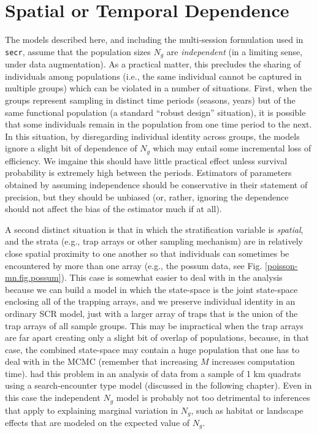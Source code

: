 \section{Spatial or Temporal Dependence}

The models described here, and including the multi-session formulation
used in \mbox{\tt secr}, assume that the population sizes $N_{g}$ are
{\it independent} (in a limiting sense, under data augmentation).  As
a practical matter, this precludes the sharing of individuals among
populations (i.e., the same individual cannot be captured in multiple
groups) which can be violated in a number of situations.  First, when
the groups represent sampling in distinct time periods (seasons,
years) but of the same functional population (a standard ``robust
design'' situation), it is possible that some individuals remain in
the population from one time period to the next.  In this situation,
by disregarding individual identity across groups, the models ignore a
slight bit of dependence of $N_{g}$ which may entail some incremental
loss of efficiency. We imgaine this should have little practical
effect unless survival probability is extremely high between the
periods.  Estimators of parameters obtained by assuming independence
should be conservative in their statement of precision, but they
should be unbiased (or, rather, ignoring the dependence should not
affect the bias of the estimator much if at all).

A second distinct situation is that in which the stratification
variable is {\it spatial}, and the strata (e.g., trap arrays or other
sampling mechanism) are in relatively close spatial proximity to one
another so that individuals can sometimes be encountered by more than
one array (e.g., the possum data, see
Fig. \ref{poisson-mn.fig.possum}). This case is somewhat easier to
deal with in the analysis because we can build a model in which the
state-space is the joint state-space enclosing all of the trapping
arrays, and we preserve individual identity in an ordinary SCR model,
just with a larger array of traps that is the union of the trap arrays
of all sample groups. This may be impractical when the trap arrays are
far apart creating only a slight bit of overlap of populations,
because, in that case, the combined state-space may contain a huge
population that one has to deal with in the MCMC (remember that
increasing $M$ increases computation time).
\citep{royle_etal:2011mee} had this problem in an analysis of data
from a sample of 1 km quadrats using a search-encounter type model
(discussed in the following chapter).  Even in this case the
independent $N_{g}$ model is probably not too detrimental to
inferences that apply to explaining marginal variation in $N_{g}$,
such as habitat or landscape effects that are modeled on the expected
value of $N_{g}$.


